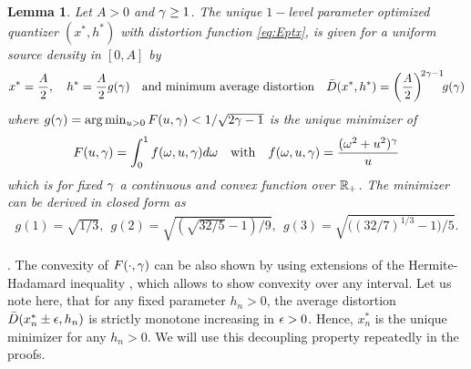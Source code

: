 \documentclass[smallabstract,smallcaptions]{dccpaper}
\newtheorem{lemma}{Lemma}
\newif\ifarxiv\arxivfalse
\newenvironment{remark}{\par\vspace{1.5ex}\noindent{\em Remark\/}.}{\par\vspace{1.5ex}}
\newcommand{\Dis}{\ensuremath{D}}                    %
\newcommand{\AvDis}{\ensuremath{\bar{\Dis}}}         %
\begin{document}
\begin{lemma}\label{lem:ggam}
  Let $A>0$ and $\gamma\geq 1$. The unique $1-$level parameter optimized quantizer $(x^*,h^*)$ with distortion
  function \eqref{eq:Eptx}, is given  for a uniform source
  density in $[0,A]$ by
  \begin{align}
    x^*=\frac{A}{2},\quad   h^*=\frac{A}{2} g(\gam) \quad\text{and minimum average distortion} \quad
    \AvDis(x^*,h^*)=\left(\frac{A}{2}\right)^{\!2\gam-1}\!\!g(\gam)\notag
  \end{align}
  where  $g(\gamma)=\arg\min_{u>0} F(u,\gamma)<1/\sqrt{2\gamma-1}$ is the unique minimizer of 
  \begin{align}
    F(u,\gamma)=\int_0^1  f(\omega,u,\gamma) d\omega \quad\text{with}\quad f(\omega,u,\gamma)=\frac{(\omega^2+u^2)^{\gamma}}{u} 
  \end{align}
  which is for fixed $\gamma$ a continuous and convex function over ${\mathbb R}_+$. The minimizer can be derived in closed form as 
  \begin{align}
    g(1) = \sqrt{1/3},\ \  g(2) = \sqrt{ (\sqrt{32/5}-1)/9}, 
    \ \  g(3) = \sqrt{\Big((32/7)^{1/3}-1\Big)/5}.\label{eq:ggam}
  \end{align}
\end{lemma}
%
\ifarxiv 
\begin{proof}
See \appref{app:proof_lemma_ggam}.
\end{proof}
\fi


\begin{remark}
  The convexity of $F(\cdot,\gamma)$ can be also shown by using extensions of the Hermite-Hadamard inequality \cite{ZC10},
  which allows to show convexity over any interval.
  Let us note here, that for any fixed parameter $h_n>0$, the average distortion $\AvDis(x_n^*\pm \eps,h_n)$ is strictly
  monotone increasing in $\epsilon>0$. Hence, $x_n^*$ is the unique minimizer for any $h_n>0$. We will use this decoupling
  property repeatedly in the proofs. 
\end{remark}
\end{document}
